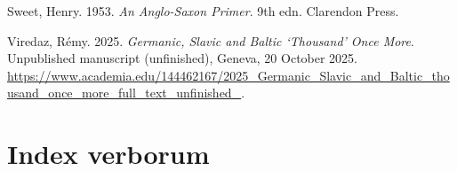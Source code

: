 \documentclass[
  british,
  a4paper,
  openany]{book}
\newlength{\cslhangindent}
\newenvironment{CSLReferences}[2] %
 {\begin{list}{}{%
  \setlength{\itemindent}{0pt}
  \setlength{\leftmargin}{0pt}
  \setlength{\parsep}{0pt}
  \ifodd #1
   \setlength{\leftmargin}{\cslhangindent}
   \setlength{\itemindent}{-1\cslhangindent}
  \fi
  \setlength{\itemsep}{#2\baselineskip}}}
 {\end{list}}
\begin{document}
\begin{CSLReferences}{1}{1}
Sweet, Henry. 1953. \emph{An {Anglo-Saxon} Primer}. 9th edn. Clarendon
Press.

Viredaz, Rémy. 2025. \emph{{Germanic}, {Slavic} and {Baltic}
{`Thousand'} Once More}. Unpublished manuscript (unfinished), Geneva, 20
October 2025.
\url{https://www.academia.edu/144462167/2025_Germanic_Slavic_and_Baltic_thousand_once_more_full_text_unfinished_}.

\end{CSLReferences}

\part*{Index verborum}


\printindex[iv]

\backmatter
\end{document}
